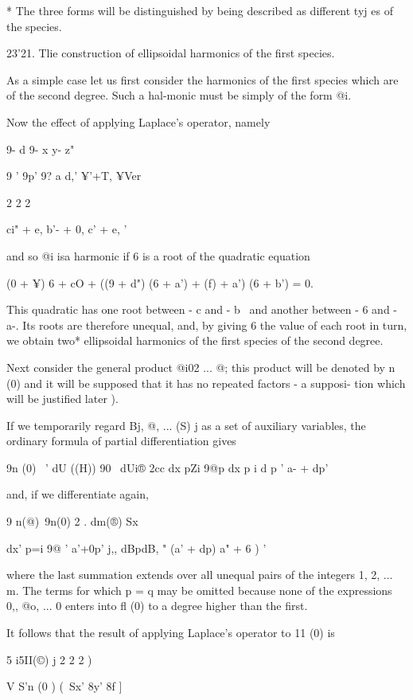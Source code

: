 * The three forms will be distinguished by being described as
different tyj es of the species.

%
%

23'21. Tlie construction of ellipsoidal harmonics of the first
species.

As a simple case let us first consider the harmonics of the first
species which are of the second degree. Such a hal-monic must be
simply of the form @i.

Now the effect of applying Laplace's operator, namely

9- d 9- x y- z"

9 ' 9p' 9? a d,' ¥'+T, ¥Ver

2 2 2

ci" + e, b'- + 0, c' + e, '

and so @i isa harmonic if 6 is a root of the quadratic equation

(0 + ¥) 6 + cO + ((9 + d") (6 + a') + (f) + a') (6 + b') = 0.

This quadratic has one root between - c and - b~ and another between -
6 and - a-. Its roots are therefore unequal, and, by giving 6 the
value of each root in turn, we obtain two* ellipsoidal harmonics of
the first species of the second degree.

Next consider the general product @i02 ... @; this product will be
denoted by n (0) and it will be supposed that it has no repeated
factors - a supposi- tion which will be justified later ).

If we temporarily regard Bj, @, ... (S) j as a set of auxiliary
variables, the ordinary formula of partial differentiation gives

9n (0) \ ' dU ((H)) 90 \ dUi® 2cc dx pZi 9@p dx p i d p ' a- + dp'

and, if we differentiate again,

9 n(@)\ 9n(0) 2 . dm(®) Sx

dx' p=i 9@ ' a'+0p' j,, dBpdB, " (a' + dp) a" + 6 ) '

where the last summation extends over all unequal pairs of the
integers 1, 2, ... m. The terms for which p = q may be omitted because
none of the expressions 0,, @o, ... 0 enters into fl (0) to a degree
higher than the first.

It follows that the result of applying Laplace's operator to 11 (0) is

5 i5II(©) j 2 2 2 )

V S'n (0 ) (\ Sx' 8y' 8f ]

